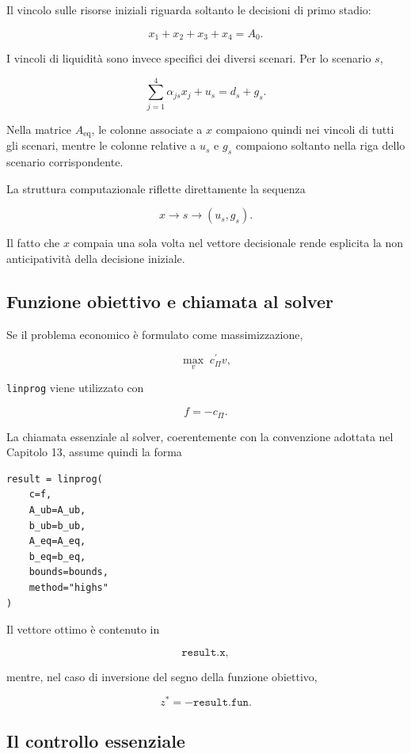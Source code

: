 Il vincolo sulle risorse iniziali riguarda soltanto le decisioni di primo
stadio:

\[
x_1+x_2+x_3+x_4=A_0.
\]

I vincoli di liquidit\`a sono invece specifici dei diversi scenari. Per lo
scenario \(s\),

\[
\sum_{j=1}^{4}\alpha_{js}x_j
+
u_s
=
d_s+g_s.
\]

Nella matrice \(A_{\mathrm{eq}}\), le colonne associate a \(x\) compaiono
quindi nei vincoli di tutti gli scenari, mentre le colonne relative a
\(u_s\) e \(g_s\) compaiono soltanto nella riga dello scenario
corrispondente.

La struttura computazionale riflette direttamente la sequenza

\[
x
\longrightarrow
s
\longrightarrow
(u_s,g_s).
\]

Il fatto che \(x\) compaia una sola volta nel vettore decisionale rende
esplicita la non anticipativit\`a della decisione iniziale.

\subsection{Funzione obiettivo e chiamata al solver}

Se il problema economico \`e formulato come massimizzazione,

\[
\max_v\; c_{\Pi}^{\prime}v,
\]

\noindent \texttt{linprog} viene utilizzato con

\[
f=-c_{\Pi}.
\]

La chiamata essenziale al solver,
coerentemente con la convenzione
adottata nel Capitolo 13,
assume quindi la forma

\begin{verbatim}
result = linprog(
    c=f,
    A_ub=A_ub,
    b_ub=b_ub,
    A_eq=A_eq,
    b_eq=b_eq,
    bounds=bounds,
    method="highs"
)
\end{verbatim}

Il vettore ottimo \`e contenuto in

\[
\texttt{result.x},
\]

\noindent mentre, nel caso di inversione del segno della funzione obiettivo,

\[
z^*
=
-\texttt{result.fun}.
\]

\subsection{Il controllo essenziale}


